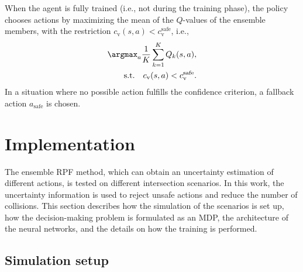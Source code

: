 
When the agent is fully trained (i.e., not during the training phase), the policy chooses actions by maximizing the mean of the $Q$-values of the ensemble members, with the restriction $c_\mathrm{v}(s,a) < c_\mathrm{v}^\mathrm{safe}$, i.e.,
%
\begin{equation}
	\begin{aligned}
		\argmax_{a} \frac{1}{K} \sum_{k=1}^K Q_k(s,a),\\
		\textrm{s.t.} \quad c_\mathrm{v}(s,a) < c_\mathrm{v}^\mathrm{safe}.
	\end{aligned}
\end{equation}
%
In a situation where no possible action fulfills the confidence criterion, a fallback action $a_\mathrm{safe}$ is chosen.


\section{Implementation}
\label{sec:implementation}


The ensemble RPF method, which can obtain an uncertainty estimation of different actions, is tested on different intersection scenarios. In this work, the uncertainty information is used to reject unsafe actions and reduce the number of collisions. 
This section describes how the simulation of the scenarios is set up, how the decision-making problem is formulated as an MDP, the architecture of the neural networks, and the details on how the training is performed.


\subsection{Simulation setup}
\label{sec:simulationModel}

